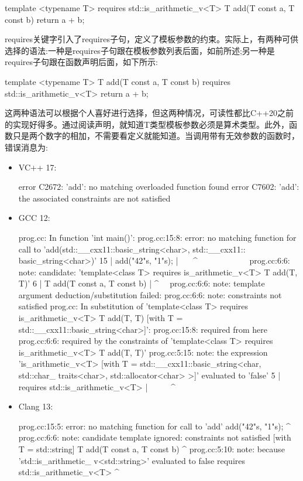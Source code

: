 \begin{cpp}
template <typename T>
requires std::is_arithmetic_v<T>
T add(T const a, T const b)
{
	return a + b;
}
\end{cpp}

requires关键字引入了requires子句，定义了模板参数的约束。实际上，有两种可供选择的语法:一种是requires子句跟在模板参数列表后面，如前所述;另一种是requires子句跟在函数声明后面，如下所示:

\begin{cpp}
template <typename T>
T add(T const a, T const b)
requires std::is_arithmetic_v<T>
{
	return a + b;
}
\end{cpp}

这两种语法可以根据个人喜好进行选择，但这两种情况，可读性都比C++20之前的实现好得多。通过阅读声明，就知道T类型模板参数必须是算术类型。此外，函数只是两个数字的相加，不需要看定义就能知道。当调用带有无效参数的函数时，错误消息为:

\begin{itemize}
\item
VC++ 17:

\begin{shell}
error C2672: 'add': no matching overloaded function found
error C7602: 'add': the associated constraints are not
satisfied
\end{shell}

\item
GCC 12:

\begin{shell}
prog.cc: In function 'int main()':
prog.cc:15:8: error: no matching function for call
to 'add(std::__cxx11::basic_string<char>, std::__cxx11::
basic_string<char>)'
  15 |    add("42"s, "1"s);
     |     ~~~^~~~~~~~~~~~~
prog.cc:6:6: note: candidate: 'template<class T> 
requires is_arithmetic_v<T> T add(T, T)'
  6  |    T add(T const a, T const b)
     |      ^~~
prog.cc:6:6: note: template argument deduction/substitution
 failed:
prog.cc:6:6: note: constraints not satisfied
prog.cc: In substitution of 'template<class
T> requires is_arithmetic_v<T> T add(T, T) [with T =
std::__cxx11::basic_string<char>]':
prog.cc:15:8: required from here
prog.cc:6:6: required by the constraints of
'template<class T> requires is_arithmetic_v<T> T add(T,
T)'
prog.cc:5:15: note: the expression 'is_arithmetic_v<T>
[with T = std::__cxx11::basic_string<char, std::char_
traits<char>, std::allocator<char> >]' evaluated to 'false'
    5 | requires std::is_arithmetic_v<T>
      |               ~~~~~^~~~~~~~~~~~~~~~~~
\end{shell}

\item
Clang 13:

\begin{shell}
prog.cc:15:5: error: no matching function for call to
'add'
add("42"s, "1"s);
^~~
prog.cc:6:6: note: candidate template ignored:
constraints not satisfied [with T = std::string]
T add(T const a, T const b)
^
prog.cc:5:10: note: because 'std::is_arithmetic_
v<std::string>' evaluated to false
requires std::is_arithmetic_v<T>
^
\end{shell}
\end{itemize}

